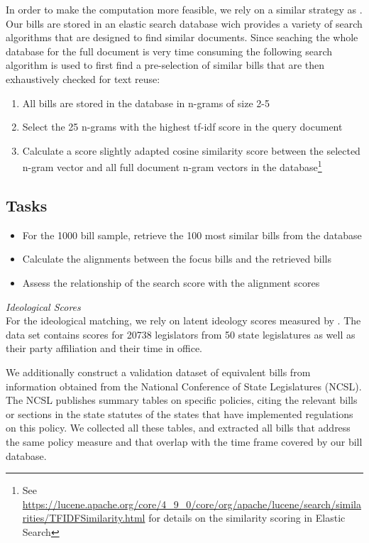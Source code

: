 \documentclass[12pt]{article} %
\begin{document}
In order to make the computation more feasible, we rely on a similar strategy as \citet{wilkerson2015tracing}. Our bills are stored in an elastic search database wich provides a variety of search algorithms that are designed to find similar documents. Since seaching the whole database for the full document is very time consuming the following search algorithm is used to first find a pre-selection of similar bills that are then exhaustively checked for text reuse:

\begin{enumerate}
\item All bills are stored in the database in n-grams of size 2-5
\item Select the 25 n-grams with the highest tf-idf score in the query document
\item Calculate a score slightly adapted cosine similarity score between the selected n-gram vector and all full document n-gram vectors in the database\footnote{See \url{https://lucene.apache.org/core/4_9_0/core/org/apache/lucene/search/similarities/TFIDFSimilarity.html} for details on the similarity scoring in Elastic Search}
\end{enumerate}

\subsection*{Tasks}

\begin{itemize}
    \item For the 1000 bill sample, retrieve the 100 most similar bills from the database 
    \item Calculate the alignments between the focus bills and the retrieved bills
    \item Assess the relationship of the search score with the alignment scores
\end{itemize}

\textit{Ideological Scores}\\
For the ideological matching, we rely on latent ideology scores measured by \citep{shor2011}. The data set contains scores for 20738 legislators from 50 state legislatures as well as their party affiliation and their time in office. 

We additionally construct a validation dataset of equivalent bills from information obtained from the National Conference of State Legislatures (NCSL). The NCSL publishes summary tables on specific policies, citing the relevant bills or sections in the state statutes of the states that have implemented regulations on this policy. We collected all these tables, and extracted all bills that address the same policy measure and that overlap with the time frame covered by our bill database.
\end{document}
